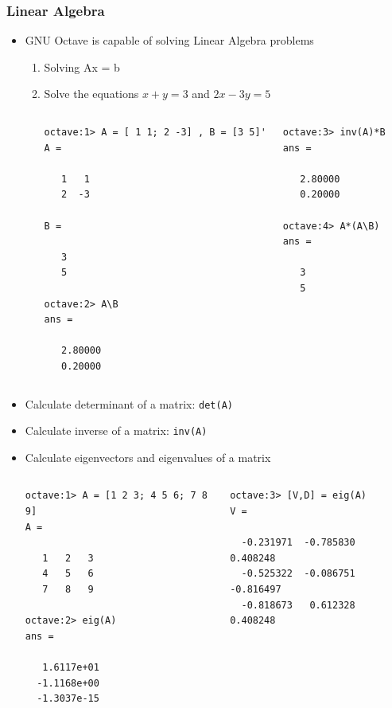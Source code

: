 \documentclass[slidestop,mathserif,compress,xcolor=svgnames]{beamer}
\begin{document}
\begin{frame}
  \frametitle{\small Linear Algebra}
  \begin{itemize}
    \item GNU Octave is capable of solving Linear Algebra problems
    \begin{enumerate}
      \item Solving Ax = b
      \item[] Solve the equations $x+y=3$ and $2x-3y=5$
      {\tiny
        \begin{columns}
          \column{4cm}
          \begin{verbatim}
octave:1> A = [ 1 1; 2 -3] , B = [3 5]'
A =

   1   1
   2  -3

B =

   3
   5

octave:2> A\B
ans =

   2.80000
   0.20000
          \end{verbatim}
          \column{4cm}
          \begin{verbatim}
octave:3> inv(A)*B
ans =

   2.80000
   0.20000

octave:4> A*(A\B)
ans =

   3
   5
          \end{verbatim}
        \end{columns}
      }
    \end{enumerate}
    \item Calculate determinant of a matrix: \texttt{det(A)}
    \item Calculate inverse of a matrix: \texttt{inv(A)}
    \framebreak
    \item Calculate eigenvectors and eigenvalues of a matrix
    {\tiny
      \begin{columns}
        \column{4cm}
        \begin{verbatim}
octave:1> A = [1 2 3; 4 5 6; 7 8 9]
A =

   1   2   3
   4   5   6
   7   8   9

octave:2> eig(A)
ans =

   1.6117e+01
  -1.1168e+00
  -1.3037e-15
        \end{verbatim}
        \column{4cm}
        \begin{verbatim}
octave:3> [V,D] = eig(A)
V =

  -0.231971  -0.785830   0.408248
  -0.525322  -0.086751  -0.816497
  -0.818673   0.612328   0.408248


\end{verbatim}
\end{columns}}
\end{itemize}
\end{frame}
\end{document}

